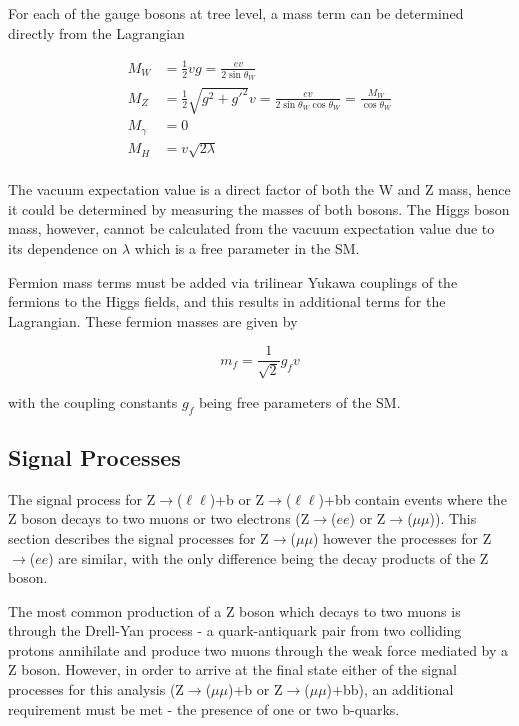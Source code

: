 \documentclass[12pt,a4paper,epsf,portrait,times,epsfig]{article}
\begin{document}
		For each of the gauge bosons at tree level, a mass term can be determined directly from the Lagrangian
		
		\begin{align}
		M_{W} &= \frac{1}{2}vg = \frac{ev}{2\sin\theta_{W}}\\
		M_{Z} &= \frac{1}{2}\sqrt{g^{2}+g'^{2}}v = \frac{ev}{2\sin\theta_{W}\cos\theta_{W}}=\frac{M_{W}}{\cos\theta_{W}} \\
		M_{\gamma} &= 0 \\
		M_{H} &= v\sqrt{2\lambda} \\
		\end{align}
		
		The vacuum expectation value is a direct factor of both the W and Z mass, hence it could be determined by measuring the masses of both bosons. The Higgs boson mass, however, cannot be calculated from the vacuum expectation value due to its dependence on $\lambda$ which is a free parameter in the SM. \par
		Fermion mass terms must be added via trilinear Yukawa couplings of the fermions to the Higgs fields, and this results in additional terms for the Lagrangian. These fermion masses are given by
		
		\begin{equation}
			m_{f} = \frac{1}{\sqrt{2}}g_{f}v
		\end{equation}
		
		with the coupling constants $g_{f}$ being free parameters of the SM. 
		
		\subsection{Signal Processes}
		
		The signal process for Z$\rightarrow$($\ell\ell$)+b or Z$\rightarrow$($\ell\ell$)+bb contain events where the Z boson decays to two muons or two electrons (Z$\rightarrow$($ee$) or Z$\rightarrow$($\mu\mu$)). This section describes the signal processes for Z$\rightarrow$($\mu\mu$) however the processes for Z$\rightarrow$($ee$) are similar, with the only difference being the decay products of the Z boson. \par
		
		The most common production of a Z boson which decays to two muons is through the Drell-Yan process \cite{Article:DrellYan} - a quark-antiquark pair from two colliding protons annihilate and produce two muons through the weak force mediated by a Z boson. However, in order to arrive at the final state either of the signal processes for this analysis (Z$\rightarrow$($\mu\mu$)+b or Z$\rightarrow$($\mu\mu$)+bb), an additional requirement must be met - the presence of one or two b-quarks. \par
		 
\end{document}
